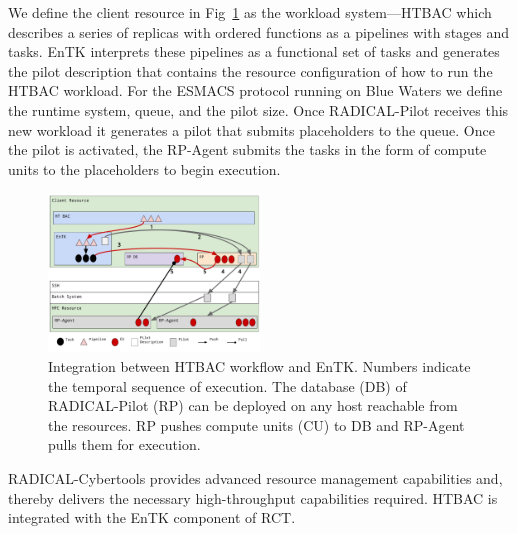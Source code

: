 We define the client resource in Fig~\ref{figure:ht-bac_rp} as the workload
system---HTBAC which describes a series of replicas with ordered functions as
a pipelines with stages and tasks. EnTK interprets these pipelines as a
functional set of tasks and generates the pilot description that contains the
resource configuration of how to run the HTBAC workload. For the ESMACS
protocol running on Blue Waters we define the runtime system, queue, and the
pilot size. Once RADICAL-Pilot receives this new workload it generates a
pilot that submits placeholders to the queue. Once the pilot is activated,
the RP-Agent submits the tasks in the form of compute units to the
placeholders to begin execution.


\begin{figure}
\centering
  \includegraphics[width=0.5\textwidth]{FIGURES/ht-bac-rp_integration.pdf}
  \caption{Integration between HTBAC workflow and EnTK\@. Numbers
  indicate the temporal sequence of execution. The database (DB) of
  RADICAL-Pilot (RP) can be deployed on any host reachable from the
  resources. RP pushes compute units (CU) to DB and RP-Agent pulls them for
  execution. }\label{figure:ht-bac_rp}
\end{figure}


RADICAL-Cybertools provides advanced resource management capabilities and,
thereby delivers the necessary high-throughput capabilities required. HTBAC is
integrated with the EnTK component of RCT. 


